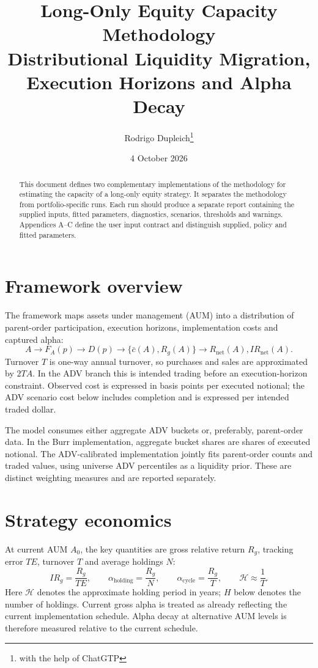 \documentclass[11pt,a4paper]{article}
\title{\textbf{Long-Only Equity Capacity Methodology}\\[0.4em]
\large Distributional Liquidity Migration, Execution Horizons and Alpha Decay}
\author{Rodrigo Dupleich\thanks{with the help of ChatGTP}}
\date{4 October 2026}
\numberwithin{equation}{section}
\begin{document}
\maketitle
\begin{abstract}
This document defines two complementary implementations of the methodology for estimating the capacity of a long-only equity
strategy. It separates the methodology from portfolio-specific runs. Each run should produce a
separate report containing the supplied inputs, fitted parameters, diagnostics, scenarios,
thresholds and warnings. Appendices A--C define the user input contract and distinguish supplied,
policy and fitted parameters.
\end{abstract}
\tableofcontents
\clearpage

\section{Framework overview}
The framework maps assets under management (AUM) into a distribution of parent-order
participation, execution horizons, implementation costs and captured alpha:
\begin{equation}\label{eq:flow}
 A\rightarrow F_A(p)\rightarrow D(p)\rightarrow
 \{\bar c(A),R_g(A)\}\rightarrow R_{\mathrm{net}}(A),IR_{\mathrm{net}}(A).
\end{equation}
Turnover $T$ is one-way annual turnover, so purchases and sales are approximated by $2TA$. In the ADV branch this is intended trading before an execution-horizon constraint. Observed cost is expressed in basis points per executed notional; the ADV scenario cost below includes completion and is expressed per intended traded dollar.

The model consumes either aggregate ADV buckets or, preferably, parent-order data. In the Burr implementation, aggregate bucket shares are shares of executed notional. The ADV-calibrated implementation jointly fits parent-order counts and traded values, using universe ADV percentiles as a liquidity prior. These are distinct weighting measures and are reported separately.

\section{Strategy economics}
At current AUM $A_0$, the key quantities are gross relative return $R_g$, tracking error $TE$,
turnover $T$ and average holdings $N$:
\begin{equation}\label{eq:economics}
 IR_g=\frac{R_g}{TE},\qquad
 \alpha_{\mathrm{holding}}=\frac{R_g}{N},\qquad
 \alpha_{\mathrm{cycle}}=\frac{R_g}{T},\qquad
 \mathcal{H}\approx\frac{1}{T}.
\end{equation}
Here $\mathcal{H}$ denotes the approximate holding period in years; $H$ below denotes the number of holdings. Current gross alpha is treated as already reflecting the current implementation schedule. Alpha
decay at alternative AUM levels is therefore measured relative to the current schedule.
\end{document}
